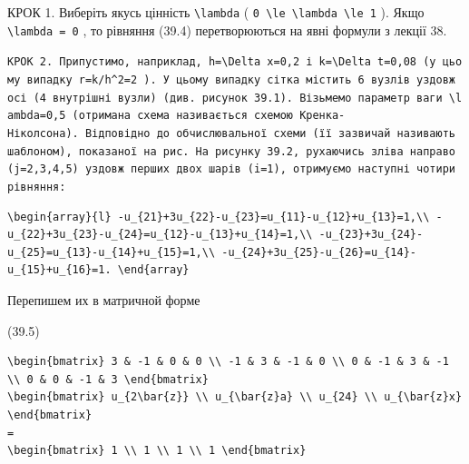 \documentclass[
  ukrainian,
]{article}
\begin{document}
КРОК 1. Виберіть якусь цінність \texttt{\textbackslash{}lambda} (
\texttt{0\ \textbackslash{}le\ \textbackslash{}lambda\ \textbackslash{}le\ 1}
). Якщо \texttt{\textbackslash{}lambda\ =\ 0} , то рівняння (39.4)
перетворюються на явні формули з лекції 38.

\texttt{КРОК\ 2.\ Припустимо,\ наприклад,\ \textquotesingle{}h=\textbackslash{}Delta\ x=0,2\textquotesingle{}\ і\ \textquotesingle{}k=\textbackslash{}Delta\ t=0,08\textquotesingle{}\ (у\ цьому\ випадку\ \textquotesingle{}r=k/h\^{}2=2\textquotesingle{}\ ).\ У\ цьому\ випадку\ сітка\ містить\ 6\ вузлів\ уздовж\ осі\ (4\ внутрішні\ вузли)\ (див.\ рисунок\ 39.1).\ Візьмемо\ параметр\ ваги\ \textquotesingle{}\textbackslash{}lambda=0,5\textquotesingle{}\ (отримана\ схема\ називається\ схемою\ Кренка-Ніколсона).\ Відповідно\ до\ обчислювальної\ схеми\ (її\ зазвичай\ називають\ шаблоном),\ показаної\ на\ рис.\ На\ рисунку\ 39.2,\ рухаючись\ зліва\ направо\ (j=2,3,4,5)\ уздовж\ перших\ двох\ шарів\ (i=1),\ отримуємо\ наступні\ чотири\ рівняння:}

\begin{verbatim}
\begin{array}{l} -u_{21}+3u_{22}-u_{23}=u_{11}-u_{12}+u_{13}=1,\\ -u_{22}+3u_{23}-u_{24}=u_{12}-u_{13}+u_{14}=1,\\ -u_{23}+3u_{24}-u_{25}=u_{13}-u_{14}+u_{15}=1,\\ -u_{24}+3u_{25}-u_{26}=u_{14}-u_{15}+u_{16}=1. \end{array}
\end{verbatim}

Перепишем их в матричной форме

(39.5)

\begin{verbatim}
\begin{bmatrix} 3 & -1 & 0 & 0 \\ -1 & 3 & -1 & 0 \\ 0 & -1 & 3 & -1 \\ 0 & 0 & -1 & 3 \end{bmatrix}
\begin{bmatrix} u_{2\bar{z}} \\ u_{\bar{z}a} \\ u_{24} \\ u_{\bar{z}x} \end{bmatrix}
=
\begin{bmatrix} 1 \\ 1 \\ 1 \\ 1 \end{bmatrix}
\end{verbatim}
\end{document}
